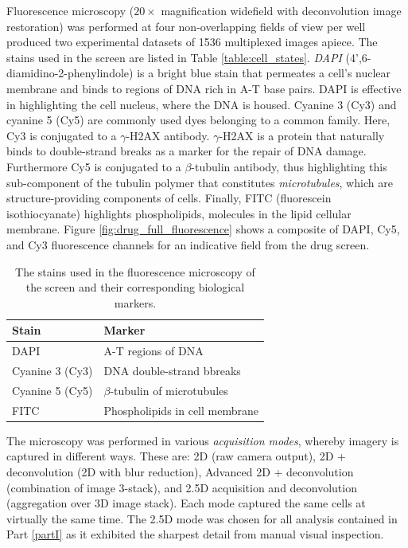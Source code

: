 Fluorescence microscopy ($20\times$ magnification widefield with deconvolution image restoration) was performed at four non-overlapping fields of view per well produced two experimental datasets of 1536 multiplexed images apiece. The stains used in the screen are listed in Table \ref{table:cell_states}. \emph{DAPI} (4',6-diamidino-2-phenylindole) is a bright blue stain that permeates a cell's nuclear membrane and binds to regions of DNA rich in A-T base pairs. DAPI is effective in highlighting the cell nucleus, where the DNA is housed. Cyanine 3 (Cy3) and cyanine 5 (Cy5) are commonly used dyes belonging to a common family. Here, Cy3 is conjugated to a $\gamma$-H2AX antibody. $\gamma$-H2AX is a protein that naturally binds to double-strand breaks as a marker for the repair of DNA damage. Furthermore Cy5 is conjugated to a $\beta$-tubulin antibody, thus highlighting this sub-component of the tubulin polymer that constitutes \emph{microtubules}, which are structure-providing components of cells. Finally, FITC (fluorescein isothiocyanate) highlights phospholipids, molecules in the lipid cellular membrane. Figure \ref{fig:drug_full_fluorescence} shows a composite of DAPI, Cy5, and Cy3 fluorescence channels for an indicative field from the drug screen.

\begin{table}
\begin{center}
\begin{tabular}{|l|l|}
\hline
Stain & Marker \\
\hline
DAPI &  A-T regions of DNA\\
\hline
Cyanine 3 (Cy3) &DNA double-strand bbreaks\\
\hline
Cyanine 5 (Cy5) & $\beta$-tubulin of microtubules\\
\hline
FITC & Phospholipids in cell membrane\\
\hline
\end{tabular}
\caption{The stains used in the fluorescence microscopy of the screen and their corresponding biological markers.}
\label{table:stains}
\end{center}
\end{table}

The microscopy was performed in various \emph{acquisition modes}, whereby imagery is captured in different ways. These are: 2D (raw camera output), 2D + deconvolution (2D with blur reduction), Advanced 2D + deconvolution (combination of image 3-stack), and 2.5D acquisition and deconvolution (aggregation over 3D image stack). Each mode captured the same cells at virtually the same time. The 2.5D mode was chosen for all analysis contained in Part \ref{partI} as it exhibited the sharpest detail from manual visual inspection.

